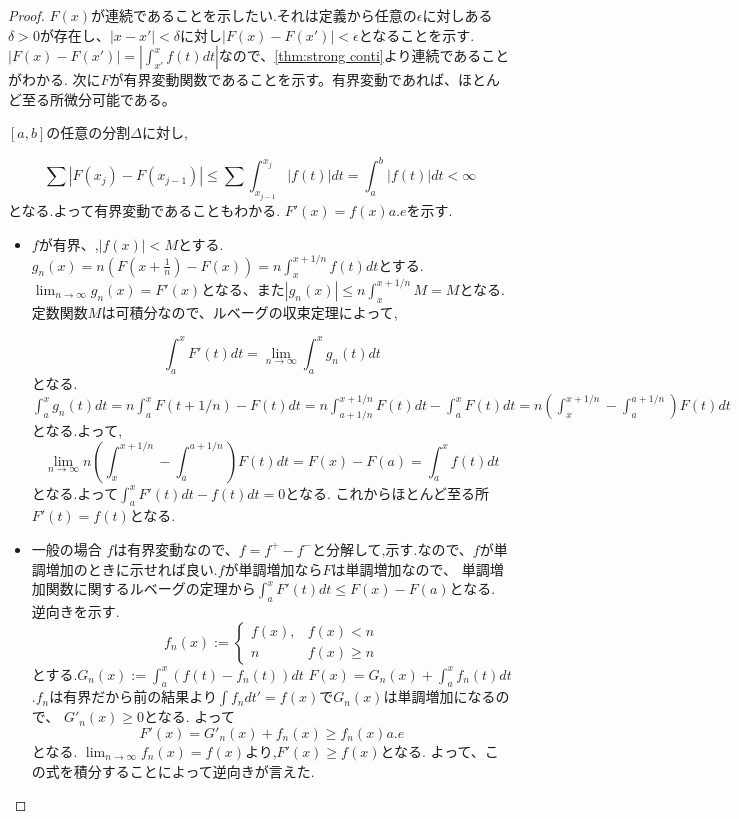 \begin{proof}
$F(x)$が連続であることを示したい.それは定義から任意の$\epsilon$に対しある$\delta > 0$が存在し、$|x - x'| < \delta $に対し$|F(x) - F(x') | < \epsilon$となることを示す.
$|F(x) - F(x')| = |\int_{x'}^x f(t)dt|$なので、\ref{thm:strong conti}より連続であることがわかる.
次に$F$が有界変動関数であることを示す。有界変動であれば、ほとんど至る所微分可能である。

$[a, b]$の任意の分割$\Delta$に対し,

\begin{equation*}
\sum |F(x_j) - F(x_{j-1})| \le \sum \int_{x_{j-1}}^{x_j} |f(t)| dt = \int_a^b |f(t)| dt < \infty
\end{equation*}
となる.よって有界変動であることもわかる.
$F'(x) = f(x) a.e$を示す.

\begin{itemize}
    \item $f$が有界、,$|f(x) | < M$とする.
    $g_n(x) =  n (F(x+ \frac{1}{n}) - F(x)) = n \int_x^{x + 1/n} f(t) dt$とする.
    $\lim_{n \to \infty} g_n(x) = F'(x)$となる、また$|g_n(x)| \le n \int_x^{x + 1/n} M =  M$となる.
    定数関数$M$は可積分なので、ルベーグの収束定理によって,
    
    \begin{equation*}
        \int_a^x F'(t) dt = \lim_{n \to \infty}\int_a^x g_n(t) dt
    \end{equation*}
   となる.
   $\int_a^x g_n(t) dt = n\int_a^x  F(t+ 1/n) - F(t) dt = n \int_{a + 1/n}^{x+1/n}F(t) dt - \int_a^x F(t)dt = n (\int_x^{x+ 1/n} - \int^{a+1/n}_a) F(t) dt$
   となる.よって,
   \begin{equation*}
       \lim_{n \to \infty} n (\int_x^{x+ 1/n} - \int^{a+1/n}_a) F(t) dt = F(x)  - F(a) = \int_a^x f(t) dt
   \end{equation*}
   となる.よって$\int_a^x F'(t)dt - f(t) dt= 0$となる.
   これからほとんど至る所$F'(t) = f(t)$となる.
   \item 一般の場合
   $f$は有界変動なので、$f = f^+ - f^-$と分解して,示す.なので、$f$が単調増加のときに示せれば良い.$f$が単調増加なら$F$は単調増加なので、
   単調増加関数に関するルベーグの定理から$\int_a^x F'(t) dt \le F(x) - F(a)$となる.
   逆向きを示す.
  \begin{equation*}
   f_n(x) := \begin{cases} f(x) ,   & f(x) < n \\ n  & f(x) \ge n \end{cases}
  \end{equation*} 
  とする.$G_n(x) := \int^x_a (f(t) - f_n(t)) dt$
  $F(x) = G_n(x) + \int_a^x f_n(t) dt$.$f_n$は有界だから前の結果より$\int f_n dt ' = f(x)$で$G_n(x)$は単調増加になるので、
  $G'_n(x) \ge 0$となる.
  よって
  \begin{equation*}
      F'(x) = G'_n(x) + f_n(x)  \ge f_n(x) a.e
  \end{equation*}
  となる.
  $\lim_{n\to \infty} f_n(x) = f(x)$より,$F'(x) \ge f(x) $となる.
  よって、この式を積分することによって逆向きが言えた.
\end{itemize}
\end{proof}



